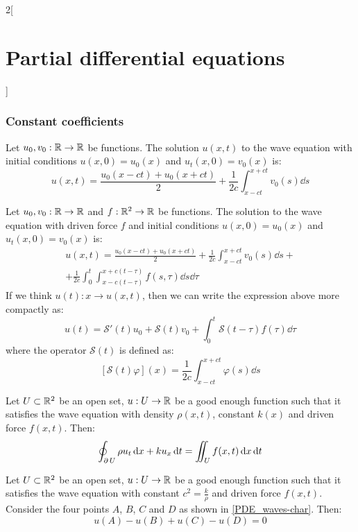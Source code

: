 \documentclass[../../../main_math.tex]{subfiles}
\begin{document}
\begin{multicols}{2}[\section{Partial differential equations}]
  \subsubsection{Constant coefficients}
  \begin{proposition}
    Let $u_0,v_0:\mathbb{R}\rightarrow\mathbb{R}$ be functions. The solution $u(x,t)$ to the wave equation with initial conditions $u(x,0)=u_0(x)$ and $u_t(x,0)=v_0(x)$ is:
    \begin{equation}\label{PDE_dAlembert}
      u(x,t)=\frac{u_0(x-ct)+u_0(x+ct)}{2}+\frac{1}{2c}\int_{x-ct}^{x+ct}v_0(s)\dd{s}
    \end{equation}
  \end{proposition}
  \begin{theorem}
    Let $u_0,v_0:\mathbb{R}\rightarrow\mathbb{R}$ and $f:\mathbb{R}^2\rightarrow\mathbb{R}$ be functions. The solution to the wave equation with driven force $f$ and initial conditions $u(x,0)=u_0(x)$ and $u_t(x,0)=v_0(x)$ is:
    \begin{multline*}
      u(x,t)=\frac{u_0(x-ct)+u_0(x+ct)}{2}+\frac{1}{2c}\int_{x-ct}^{x+ct}v_0(s)\dd{s}+\\+\frac{1}{2c}\int_0^t\int_{x-c(t-\tau)}^{x+c(t-\tau)}f(s,\tau)\dd{s}\dd{\tau}
    \end{multline*}
    If we think $u(t):x\rightarrow u(x,t)$, then we can write the expression above more compactly as: $$u(t)=\mathcal{S}'(t)u_0+\mathcal{S}(t)v_0+\int_0^t\mathcal{S}(t-\tau) f(\tau)\dd{\tau}$$ where the operator $\mathcal{S}(t)$ is defined as: $$\left[\mathcal{S}(t)\varphi\right](x)=\frac{1}{2c}\int_{x-ct}^{x+ct}\varphi(s)\dd{s}$$
  \end{theorem}
  \begin{theorem}
    Let $U\subset\mathbb{R}^2$ be an open set, $u:U\rightarrow\mathbb{R}$ be a good enough function such that it satisfies the wave equation with density $\rho(x,t)$, constant $k(x)$ and driven force $f(x,t)$. Then:
    $$\oint_{\operatorname{\partial}{U}}\rho u_t\dd{x}+k u_x\dd{t}=\iint_Uf(x,t)\dd{x}\dd{t}$$
  \end{theorem}
  \begin{proposition}
    Let $U\subset\mathbb{R}^2$ be an open set, $u:U\rightarrow\mathbb{R}$ be a good enough function such that it satisfies the wave equation with constant $c^2=\frac{k}{\rho}$ and driven force $f(x,t)$. Consider the four points $A$, $B$, $C$ and $D$ as shown in \cref{PDE_waves-char}. Then:
    \begin{equation}\label{PDE_charwaveseq}
      u(A)-u(B)+u(C)-u(D)=0
    \end{equation}

\end{proposition}
\end{multicols}
\end{document}
